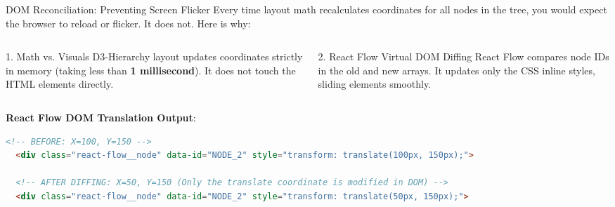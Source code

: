\documentclass[aspectratio=169, 10pt]{beamer}
\begin{document}
\begin{frame}[fragile]{DOM Reconciliation: Preventing Screen Flicker}
  Every time layout math recalculates coordinates for all nodes in the tree, you would expect the browser to reload or flicker. It does not. Here is why:
  \vspace{0.4em}
  \begin{columns}
    \begin{column}{0.5\textwidth}
      \begin{block}{1. Math vs. Visuals}
        D3-Hierarchy layout updates coordinates strictly in memory (taking less than \textbf{1 millisecond}). It does not touch the HTML elements directly.
      \end{block}
    \end{column}
    \begin{column}{0.5\textwidth}
      \begin{block}{2. React Flow Virtual DOM Diffing}
        React Flow compares node IDs in the old and new arrays. It updates only the CSS inline styles, sliding elements smoothly.
      \end{block}
    \end{column}
  \end{columns}
  \vspace{0.2em}
  \textbf{React Flow DOM Translation Output}:
  \begin{lstlisting}[language=html]
  <!-- BEFORE: X=100, Y=150 -->
  <div class="react-flow__node" data-id="NODE_2" style="transform: translate(100px, 150px);">
  
  <!-- AFTER DIFFING: X=50, Y=150 (Only the translate coordinate is modified in DOM) -->
  <div class="react-flow__node" data-id="NODE_2" style="transform: translate(50px, 150px);">
  \end{lstlisting}
\end{frame}
\end{document}
